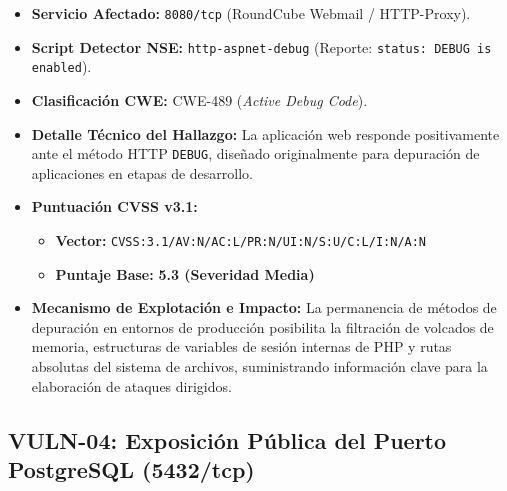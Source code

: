 \begin{itemize}
  \item \textbf{Servicio Afectado:} \texttt{8080/tcp} (RoundCube Webmail / HTTP-Proxy).
  \item \textbf{Script Detector NSE:} \texttt{http-aspnet-debug} (Reporte: \texttt{status: DEBUG is enabled}).
  \item \textbf{Clasificación CWE:} CWE-489 (\textit{Active Debug Code}).
  \item \textbf{Detalle Técnico del Hallazgo:} La aplicación web responde positivamente ante el método HTTP \texttt{DEBUG}, diseñado originalmente para depuración de aplicaciones en etapas de desarrollo.
  \item \textbf{Puntuación CVSS v3.1:}
    \begin{itemize}
      \item \textbf{Vector:} \texttt{CVSS:3.1/AV:N/AC:L/PR:N/UI:N/S:U/C:L/I:N/A:N}
      \item \textbf{Puntaje Base:} \textbf{5.3 (Severidad Media)}
    \end{itemize}
  \item \textbf{Mecanismo de Explotación e Impacto:} La permanencia de métodos de depuración en entornos de producción posibilita la filtración de volcados de memoria, estructuras de variables de sesión internas de PHP y rutas absolutas del sistema de archivos, suministrando información clave para la elaboración de ataques dirigidos.
\end{itemize}

\subsection{VULN-04: Exposición Pública del Puerto PostgreSQL (5432/tcp)}

